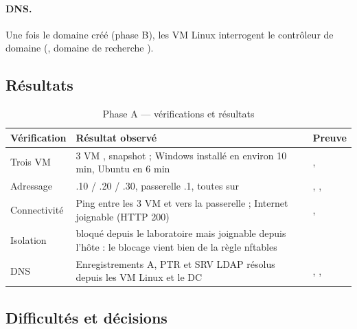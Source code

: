 \paragraph{DNS.} Une fois le domaine créé (phase B), les VM Linux interrogent le contrôleur de
domaine (, domaine de recherche ).


\subsection{Résultats}

\begin{table}[H]
\centering
\caption{Phase A — vérifications et résultats}\label{tab:phase-a}
\begin{tabularx}{\linewidth}{@{}P{2.8cm}LP{2.3cm}@{}}
\toprule
\textbf{Vérification} & \textbf{Résultat observé} & \textbf{Preuve} \\
\midrule
Trois VM & 3 VM , snapshot  ; Windows installé en environ 10 min, Ubuntu en 6 min & ,  \\
Adressage & .10 / .20 / .30, passerelle .1, toutes sur  & , ,  \\
Connectivité & Ping entre les 3 VM et vers la passerelle ; Internet joignable (HTTP 200) & ,  \\
Isolation &  bloqué depuis le laboratoire mais joignable depuis l'hôte : le blocage vient bien de la règle nftables &  \\
DNS & Enregistrements A, PTR et SRV LDAP résolus depuis les VM Linux et le DC & , ,  \\
\bottomrule
\end{tabularx}
\end{table}

\subsection{Difficultés et décisions}

